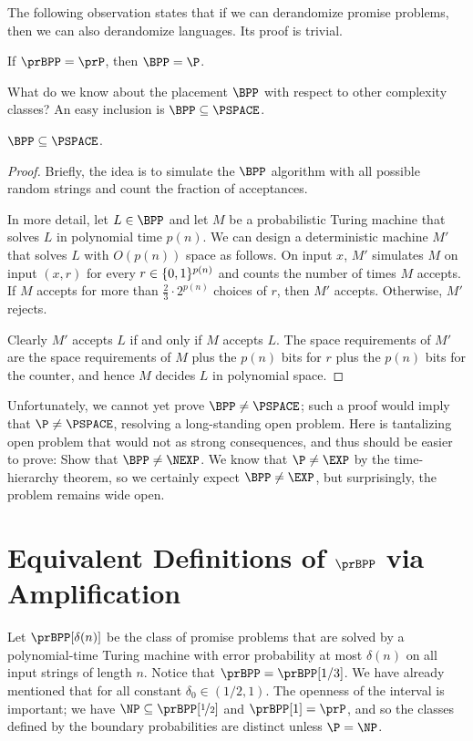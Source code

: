 The following observation states that if we can derandomize promise problems,
then we can also derandomize languages. Its proof is trivial.

\begin{observation}
  If $\prBPP = \prP$, then $\BPP = \P$.
\end{observation}

What do we know about the placement $\BPP$ with respect to other complexity
classes? An easy inclusion is $\BPP \subseteq \PSPACE$.

\begin{proposition}
  $\BPP \subseteq \PSPACE$.
\end{proposition}
\begin{proof}
  Briefly, the idea is to simulate the $\BPP$ algorithm with all possible
  random strings and count the fraction of acceptances.

  In more detail, let $L \in \BPP$ and let $M$ be a probabilistic Turing
  machine that solves $L$ in polynomial time $p(n)$. We can design a
  deterministic machine $M'$ that solves $L$ with $O(p(n))$ space as follows.
  On input $x$, $M'$ simulates $M$ on input $(x, r)$ for every $r \in
  \{0,1\}^{p(n)}$ and counts the number of times $M$ accepts. If $M$ accepts
  for more than $\frac{2}{3} \cdot 2^{p(n)}$ choices of $r$, then $M'$ accepts.
  Otherwise, $M'$ rejects.

  Clearly $M'$ accepts $L$ if and only if $M$ accepts $L$. The space
  requirements of $M'$ are the space requirements of $M$ plus the $p(n)$ bits
  for $r$ plus the $p(n)$ bits for the counter, and hence $M$ decides $L$ in
  polynomial space.
\end{proof}

Unfortunately, we cannot yet prove $\BPP \ne \PSPACE$; such a proof would imply
that $\P \ne \PSPACE$, resolving a long-standing open problem. Here is
tantalizing open problem that would not as strong consequences, and thus should
be easier to prove: Show that $\BPP \ne \NEXP$. We know that $\P
\ne \EXP$ by the time-hierarchy theorem, so we certainly expect $\BPP \ne
\EXP$, but surprisingly, the problem remains wide open.

\section{Equivalent Definitions of \texorpdfstring{$\prBPP$}{prBPP} via Amplification}

Let $\prBPP[\delta(n)]$ be the class of promise problems that are solved by a
polynomial-time Turing machine with error probability at most $\delta(n)$ on
all input strings of length $n$. Notice that $\prBPP = \prBPP[1/3]$. We have
already mentioned that for all constant $\delta_0 \in (1/2, 1)$.
The openness of the interval is important; we have $\NP \subseteq \prBPP[\nicefrac{1}{2}]$ and $\prBPP[1] = \prP$, and so the classes defined by the boundary probabilities are distinct unless $\P = \NP$.

